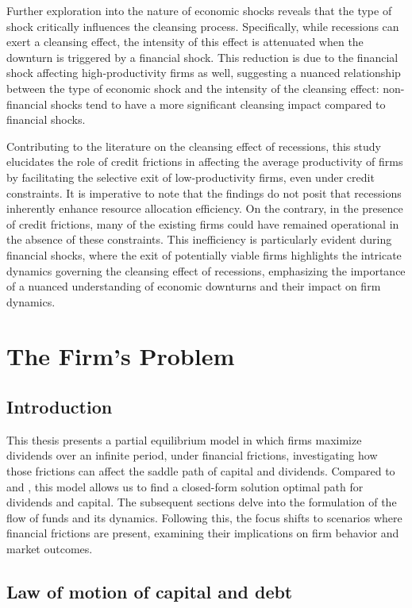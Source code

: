 \documentclass[12pt]{report}
\begin{document}
Further exploration into the nature of economic shocks reveals that the type of shock critically influences the
cleansing process. Specifically, while recessions can exert a cleansing effect, the intensity of this effect is
attenuated when the downturn is triggered by a financial shock. This reduction is due to the financial shock affecting
high-productivity firms as well, suggesting a nuanced relationship between the type of economic shock and the intensity
of the cleansing effect: non-financial shocks tend to have a more significant cleansing impact compared to financial
shocks. 

Contributing to the literature on the cleansing effect of recessions, this study elucidates the role of credit frictions
in affecting the average productivity of firms by facilitating the selective exit of low-productivity firms, even under
credit constraints. It is imperative to note that the findings do not posit that recessions inherently enhance resource
allocation efficiency. On the contrary, in the presence of credit frictions, many of the existing firms could have
remained operational in the absence of these constraints. This inefficiency is particularly evident during financial
shocks, where the exit of potentially viable firms highlights the intricate dynamics governing the cleansing effect of
recessions, emphasizing the importance of a nuanced understanding of economic downturns and their impact on firm
dynamics. 



\chapter{The Firm's Problem}
\section{Introduction}
This thesis presents a partial equilibrium model in which firms maximize dividends over an infinite period, under financial frictions,
investigating how those frictions can affect the saddle path of capital and dividends. Compared to \cite{OsePap17} and
\cite{CabHarm94}, this
model allows us to find a closed-form solution optimal path for dividends and capital.
The subsequent sections delve into the formulation of the flow of funds and its dynamics. Following this, the focus
shifts to scenarios  where financial frictions are present, examining their
implications on firm behavior and market outcomes. 

\section{Law of motion of capital and debt}
\end{document}
